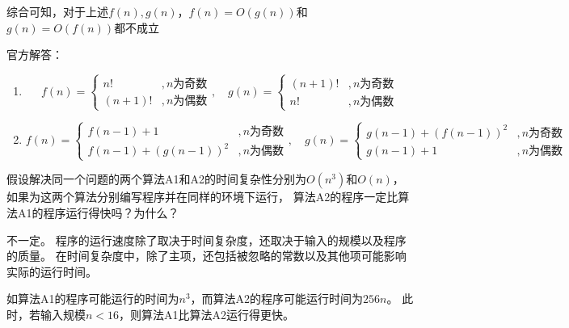 \begin{questions}
\begin{solution}
        综合可知，对于上述$f(n),g(n)$，$f(n)=O(g(n))$和$g(n)=O(f(n))$都不成立
    \end{solution}


    \begin{solution}
        官方解答：
        \begin{enumerate}
            \item \[
                      f(n) = \begin{cases}
                          n!     & , n\text{为奇数} \\
                          (n+1)! & , n\text{为偶数}
                      \end{cases}, \quad
                      g(n) = \begin{cases}
                          (n+1)! & , n\text{为奇数} \\
                          n!     & , n\text{为偶数}
                      \end{cases}
                  \]
            \item \[
                      f(n) = \begin{cases}
                          f(n-1) + 1          & , n\text{为奇数} \\
                          f(n-1) + (g(n-1))^2 & , n\text{为偶数}
                      \end{cases}, \quad
                      g(n) = \begin{cases}
                          g(n-1) + (f(n-1))^2 & , n\text{为奇数} \\
                          g(n-1) + 1          & , n\text{为偶数}
                      \end{cases}
                  \]
        \end{enumerate}


    \end{solution}



    \question 假设解决同一个问题的两个算法A1和A2的时间复杂性分别为$O(n^3)$和$O(n)$，
    如果为这两个算法分别编写程序并在同样的环境下运行，
    算法A2的程序一定比算法A1的程序运行得快吗？为什么？

    \begin{solution}
        不一定。
        程序的运行速度除了取决于时间复杂度，还取决于输入的规模以及程序的质量。
        在时间复杂度中，除了主项，还包括被忽略的常数以及其他项可能影响实际的运行时间。

        如算法A1的程序可能运行的时间为$n^3$，而算法A2的程序可能运行时间为$256n$。
        此时，若输入规模$n < 16$，则算法A1比算法A2运行得更快。
    \end{solution}


\end{questions}
